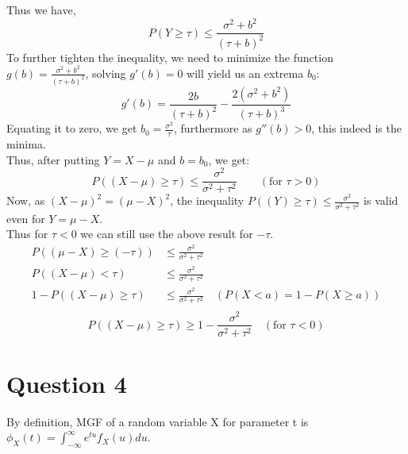 \documentclass[11pt, fleqn]{article}
\begin{document}
Thus we have,
$$
    P(Y \ge \tau) \le \frac{\sigma^2 + b^2}{(\tau + b)^2}
$$
To further tighten the inequality, we need to minimize the function $ g(b) =  \frac{\sigma^2 + b^2}{(\tau + b)^2} $, solving $ g'(b) = 0 $ will yield us an extrema $b_0$:
$$ g'(b) = \frac{2b}{(\tau + b)^2} - \frac{2(\sigma^2 + b^2)}{(\tau + b)^3} $$
Equating it to zero, we get $ b_0 = \frac{\sigma^2}{\tau} $, furthermore as $g''(b) > 0$, this indeed is the minima.\\
Thus, after putting $Y = X - \mu$ and $b = b_0$, we get:
$$
    \boxed{P((X-\mu) \ge \tau) \le \frac{\sigma^2}{\sigma^2+\tau^2}} \hspace{2em} (\text{for } \tau > 0)
$$
Now, as $(X-\mu)^2 = (\mu - X)^2$, the inequality $ P((Y) \ge \tau) \le \frac{\sigma^2}{\sigma^2+\tau^2} $ is valid even for $Y = \mu -X$.\\
Thus for $ \tau < 0 $ we can still use the above result for $ -\tau $.\\
$$
\begin{aligned}
P((\mu - X) \ge (-\tau)) &\le \frac{\sigma^2}{\sigma^2+\tau^2}\\
P((X-\mu) < \tau) &\le \frac{\sigma^2}{\sigma^2+\tau^2}\\
1-P((X-\mu) \ge \tau) &\le \frac{\sigma^2}{\sigma^2+\tau^2} \hspace{1em} (P(X < a) = 1 - P(X \ge a))\\
\end{aligned}
$$
$$
\boxed{P((X-\mu) \ge \tau) \ge 1 - \frac{\sigma^2}{\sigma^2+\tau^2}} \hspace{1em} (\text{for } \tau < 0)
$$









\newpage
\section*{Question 4}
\setcounter{equation}{0}

By definition, MGF of a random variable X for parameter t is $\phi_X(t) = \int_{-\infty}^{\infty} e^{tu} f_X(u) du$.\\
\end{document}
